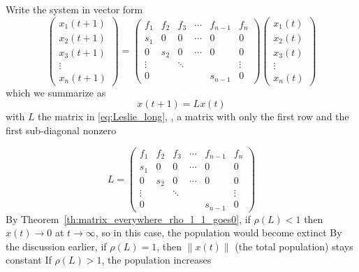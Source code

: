 \documentclass[aspectratio=169]{beamer}
\begin{document}
\begin{frame}
Write the system in vector form
\begin{equation}\label{eq:Leslie_long}
\begin{pmatrix}
x_1(t+1) \\ x_2(t+1) \\ x_3(t+1) \\ \vdots \\ x_n(t+1)
\end{pmatrix}
=
\begin{pmatrix}
f_1 & f_2 & f_3 & \cdots & f_{n-1} & f_n \\
s_1 & 0 & 0 & \cdots & 0 & 0 \\
0 & s_2 & 0 & \cdots & 0 & 0 \\
\vdots && \ddots &&& \vdots \\
0 &&&&s_{n-1} & 0
\end{pmatrix}
\begin{pmatrix}
x_1(t) \\ x_2(t) \\ x_3(t) \\ \vdots \\ x_n(t)
\end{pmatrix}
\end{equation}
which we summarize as
\begin{equation}\label{eq:Leslie_short}
x(t+1)=Lx(t)
\end{equation}
with $L$ the matrix in \eqref{eq:Leslie_long}, \ie, a  matrix with only the first row and the first sub-diagonal nonzero
\end{frame}


\begin{frame}
\[
L= \begin{pmatrix}
f_1 & f_2 & f_3 & \cdots & f_{n-1} & f_n \\
s_1 & 0 & 0 & \cdots & 0 & 0 \\
0 & s_2 & 0 & \cdots & 0 & 0 \\
\vdots && \ddots &&& \vdots \\
0 &&&&s_{n-1} & 0
\end{pmatrix}
\]
\vfill
By Theorem~\ref{th:matrix_everywhere_rho_l_1_goes0}, if $\rho(L)<1$ then $x(t)\to 0$ at $t\to\infty$, so in this case, the population would become extinct
\vfill
By the discussion earlier, if $\rho(L)=1$, then $\|x(t)\|$ (the total population) stays constant
\vfill
If $\rho(L)>1$, the population increases
\end{frame}

\end{document}
